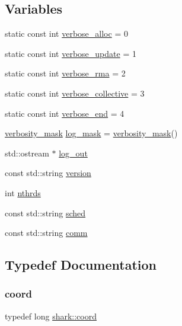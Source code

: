 \subsection*{Variables}
\begin{DoxyCompactItemize}
\item 
static const int \hyperlink{namespaceshark_a067e8941bdd5f38f5ab2e49920787b9d}{verbose\+\_\+alloc} = 0
\item 
static const int \hyperlink{namespaceshark_a054837402a3923de5acc50070b378cd6}{verbose\+\_\+update} = 1
\item 
static const int \hyperlink{namespaceshark_a8faafcaa495b6cf0c0eca37a846e45f2}{verbose\+\_\+rma} = 2
\item 
static const int \hyperlink{namespaceshark_a8a29362250362c792179fc4096ae03a6}{verbose\+\_\+collective} = 3
\item 
static const int \hyperlink{namespaceshark_a0603d8d658beed6e7e3fc44471f5c04f}{verbose\+\_\+end} = 4
\item 
\hyperlink{namespaceshark_a882c3e22f3e4476cf4a95f34a42e27eb}{verbosity\+\_\+mask} \hyperlink{namespaceshark_a110e03e8104b06caef346fcc25621aa9}{log\+\_\+mask} = \hyperlink{namespaceshark_a882c3e22f3e4476cf4a95f34a42e27eb}{verbosity\+\_\+mask}()
\item 
std\+::ostream $\ast$ \hyperlink{namespaceshark_a503a509b9d2d2710abe48d6c3338abc0}{log\+\_\+out}
\item 
const std\+::string \hyperlink{namespaceshark_a448eaebf80d9b1ee807faf964db030de}{version}
\item 
int \hyperlink{namespaceshark_a4912c1d983c9655b4ed992ac1f99530f}{nthrds}
\item 
const std\+::string \hyperlink{namespaceshark_ae92376c2b8a35cd983f3f7eea9ab959b}{sched}
\item 
const std\+::string \hyperlink{namespaceshark_addbd5781efcffd1b0502c83220027b90}{comm}
\end{DoxyCompactItemize}


\subsection{Typedef Documentation}
\hypertarget{namespaceshark_a767a92d5dd82cb82266473bff42fa6d9}{}\label{namespaceshark_a767a92d5dd82cb82266473bff42fa6d9} 
\subsubsection{\texorpdfstring{coord}{coord}}
{\footnotesize\ttfamily typedef long \hyperlink{namespaceshark_a767a92d5dd82cb82266473bff42fa6d9}{shark\+::coord}}

